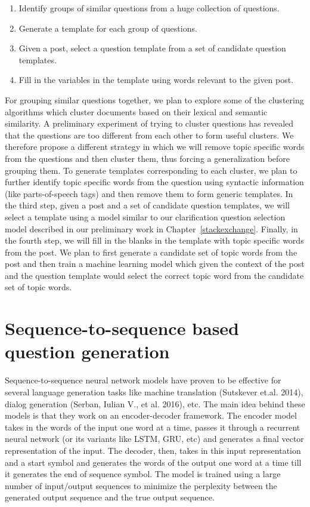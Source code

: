 \documentclass[11pt]{report}
\renewcommand\cite{\citep}	%
\begin{document}
\begin{enumerate}
\item Identify groups of similar questions from a huge collection of questions.
\item Generate a template for each group of questions.
\item Given a post, select a question template from a set of candidate question templates.
\item Fill in the variables in the template using words relevant to the given post.
\end{enumerate}

\noindent
For grouping similar questions together, we plan to explore some of the clustering algorithms which cluster documents based on their lexical and semantic similarity. A preliminary experiment of trying to cluster questions has revealed that the questions are too different from each other to form useful clusters. We therefore propose a different strategy in which we will remove topic specific words from the questions and then cluster them, thus forcing a generalization before grouping them. To generate templates corresponding to each cluster, we plan to further identify topic specific words from the question using syntactic information (like parts-of-speech tags) and then remove them to form generic templates. In the third step, given a post and a set of candidate question templates, we will select a template using a model similar to our clarification question selection model described in our preliminary work in Chapter~\ref{stackexchange}. Finally, in the fourth step, we will fill in the blanks in the template with topic specific words from the post. We plan to first generate a candidate set of topic words from the post and then train a machine learning model which given the context of the post and the question template would select the correct topic word from the candidate set of topic words.
 
\newpage
\section{Sequence-to-sequence based question generation}

Sequence-to-sequence neural network models have proven to be effective for several language generation tasks like machine translation (Sutskever et.al. 2014), dialog generation (Serban, Iulian V., et al. 2016), etc. The main idea behind these models is that they work on an encoder-decoder framework. The encoder model takes in the words of the input one word at a time, passes it through a recurrent neural network (or its variants like LSTM, GRU, etc) and generates a final vector representation of the input. The decoder, then, takes in this input representation and a start symbol and generates the words of the output one word at a time till it generates the end of sequence symbol. The model is trained using a large number of input/output sequences to minimize the perplexity between the generated output sequence and the true output sequence.\\
\end{document}
